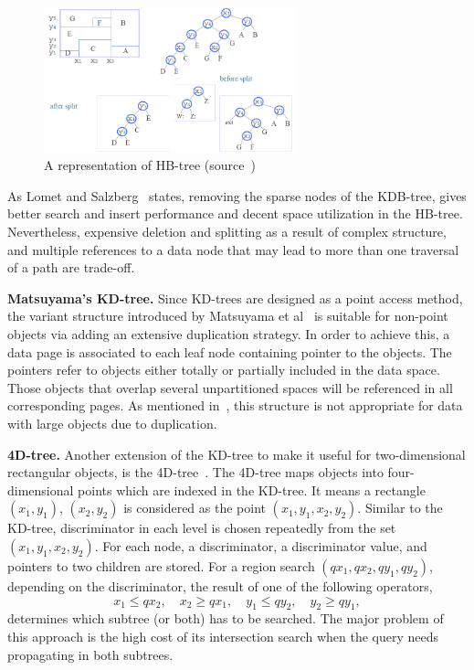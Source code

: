 \documentclass[a4paper,12pt]{article}
\begin{document}
\begin{figure}
\centering
\includegraphics[width=0.65\textwidth,height=0.2\textheight]{hbtree}
\caption{A representation of HB-tree (source~\cite{hbtree1})}
\label{fighbtree}
\end{figure}

As Lomet and Salzberg~\cite{hbtree1} states, removing the sparse nodes of the KDB-tree, gives better search and insert performance and decent space utilization in the HB-tree. Nevertheless, expensive deletion and splitting as a result of complex structure, and multiple references to a data node that may lead to more than one traversal of a path are trade-off.

\textbf{Matsuyama's KD-tree.} Since KD-trees are designed as a point access method, the variant structure introduced by Matsuyama et al~\cite{matsuyama} is suitable for non-point objects via adding an extensive duplication strategy. In order to achieve this, a data page is associated to each leaf node containing pointer to the objects. The pointers refer to objects either totally or partially included in the data space. Those objects that overlap several unpartitioned spaces will be referenced in all corresponding pages. As mentioned in~\cite{survey}, this structure is not appropriate for data with large objects due to duplication.

\textbf{4D-tree.} Another extension of the KD-tree to make it useful for two-dimensional rectangular objects, is the 4D-tree~\cite{4dtree}. The 4D-tree maps objects into four-dimensional points which are indexed in the KD-tree. It means a rectangle $(x‍‍_1, y_1)$, $(x_2, y_2)$ is considered as the point $(x‍‍_1, y_1, x_2, y_2)$. Similar to the 	KD-tree, discriminator in each level is chosen repeatedly from the set $(x‍‍_1, y_1, x_2, y_2)$. For each node, a discriminator, a discriminator value, and pointers to two children are stored. 
For a region search $(qx_1, qx_2, qy_1, qy_2)$, depending on the discriminator, the result of one of the following operators,
$$x_1 \leq qx_2, \quad x_2 \geq qx_1, \quad y_1 \leq qy_2, \quad y_2 \geq qy_1,$$ 
determines which subtree (or both) has to be searched.
The major problem of this approach is the high cost of its intersection search when the query needs propagating in both subtrees. 
\end{document}
